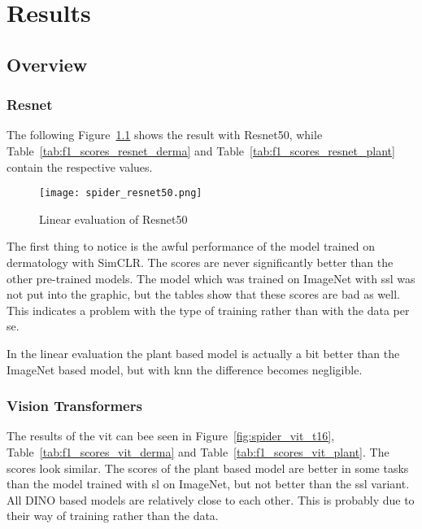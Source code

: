 \chapter{Results}\label{chapter_4}

\section{Overview}
\subsection{Resnet}

The following Figure~\ref{fig:spider_resnet50} shows the result with Resnet50, while Table~\ref{tab:f1_scores_resnet_derma} and Table~\ref{tab:f1_scores_resnet_plant} contain the respective values.
\begin{figure}[H]
    \begin{center}
    \texttt{[image: spider\_resnet50.png]}
    \caption{Linear evaluation of Resnet50}\label{fig:spider_resnet50}
    \end{center}
\end{figure}

The first thing to notice is the awful performance of the model trained on dermatology with SimCLR. The scores are never significantly better than the other pre-trained models. The model which was trained on ImageNet with \gls{ssl} was not put into the graphic, but the tables show that these scores are bad as well. 
This indicates a problem with the type of training rather than with the data per se.

In the linear evaluation the plant based model is actually a bit better than the ImageNet based model, but with \gls{knn} the difference becomes negligible.



\subsection{Vision Transformers}

The results of the \gls{vit} can bee seen in Figure~\ref{fig:spider_vit_t16}, Table~\ref{tab:f1_scores_vit_derma} and Table~\ref{tab:f1_scores_vit_plant}. 
The scores look similar. The scores of the plant based model are better in some tasks than the model trained with \gls{sl} on ImageNet, but not better than the \gls{ssl} variant. All DINO based models are relatively close to each other. This is probably due to their way of training rather than the data.

